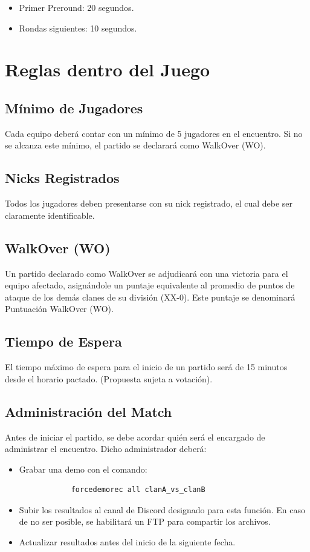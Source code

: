 \documentclass[a4paper, 11pt]{article}
\begin{document}
    \begin{itemize}
        \item Primer Preround: 20 segundos.
        \item Rondas siguientes: 10 segundos.
    \end{itemize}

    \clearpage

    \section{Reglas dentro del Juego}

    \subsection{Mínimo de Jugadores}
    Cada equipo deberá contar con un mínimo de 5 jugadores en el encuentro. Si no se alcanza este mínimo, el partido se declarará como WalkOver (WO).

    \subsection{Nicks Registrados}
    Todos los jugadores deben presentarse con su nick registrado, el cual debe ser claramente identificable.

    \subsection{WalkOver (WO)}
    Un partido declarado como WalkOver se adjudicará con una victoria para el equipo afectado, asignándole un puntaje equivalente al promedio de puntos de ataque de los demás clanes de su división (XX-0). Este puntaje se denominará Puntuación WalkOver (WO).

    \subsection{Tiempo de Espera}
    El tiempo máximo de espera para el inicio de un partido será de 15 minutos desde el horario pactado. (Propuesta sujeta a votación).

    \subsection{Administración del Match}
    Antes de iniciar el partido, se debe acordar quién será el encargado de administrar el encuentro. Dicho administrador deberá:

    \begin{itemize}
        \item Grabar una demo con el comando:
        \begin{lstlisting}
            forcedemorec all clanA_vs_clanB
        \end{lstlisting}
        \item Subir los resultados al canal de Discord designado para esta función. En caso de no ser posible, se habilitará un FTP para compartir los archivos.
        \item Actualizar resultados antes del inicio de la siguiente fecha.
    \end{itemize}
\end{document}

